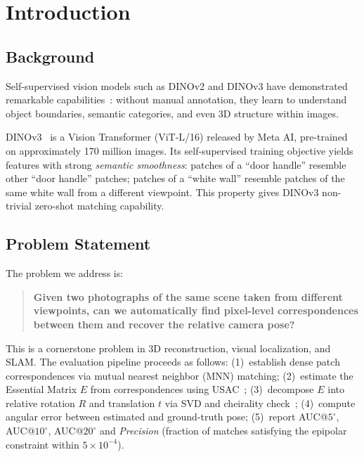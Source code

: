 \documentclass[11pt,a4paper]{article}
\begin{document}
\section{Introduction}

\subsection{Background}

Self-supervised vision models such as DINOv2 and DINOv3 have demonstrated remarkable capabilities~\cite{dino,dinov2}: without manual annotation, they learn to understand object boundaries, semantic categories, and even 3D structure within images.

DINOv3~\cite{dinov2,darcet2023registers} is a Vision Transformer (ViT-L/16) released by Meta AI, pre-trained on approximately 170 million images. Its self-supervised training objective yields features with strong \emph{semantic smoothness}: patches of a ``door handle'' resemble other ``door handle'' patches; patches of a ``white wall'' resemble patches of the same white wall from a different viewpoint. This property gives DINOv3 non-trivial zero-shot matching capability.

\subsection{Problem Statement}

The problem we address is:

\begin{quote}
\bfseries Given two photographs of the same scene taken from different viewpoints, can we automatically find pixel-level correspondences between them and recover the relative camera pose?
\end{quote}

This is a cornerstone problem in 3D reconstruction, visual localization, and SLAM. The evaluation pipeline proceeds as follows: (1)~establish dense patch correspondences via mutual nearest neighbor (MNN) matching; (2)~estimate the Essential Matrix $E$ from correspondences using USAC~\cite{usac}; (3)~decompose $E$ into relative rotation $R$ and translation $t$ via SVD and cheirality check~\cite{nister2004}; (4)~compute angular error between estimated and ground-truth pose; (5)~report AUC@$5^\circ$, AUC@$10^\circ$, AUC@$20^\circ$ and \emph{Precision} (fraction of matches satisfying the epipolar constraint within $5\times10^{-4}$).
\end{document}
